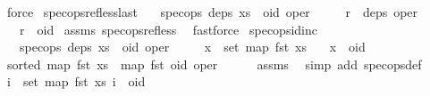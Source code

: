 \begin{isabellebody}
\ force%
\endisatagproof
{\isafoldproof}%
%
\isadelimproof
\isanewline
%
\endisadelimproof
\isanewline
{}\isamarkupfalse%
\ spec{\isacharunderscore}ops{\isacharunderscore}ref{\isacharunderscore}less{\isacharunderscore}last{\isacharcolon}\isanewline
\ \ \ {\isachardoublequoteopen}spec{\isacharunderscore}ops\ deps\ {\isacharparenleft}xs\ {\isacharat}\ {\isacharbrackleft}{\isacharparenleft}oid{\isacharcomma}\ oper{\isacharparenright}{\isacharbrackright}{\isacharparenright}{\isachardoublequoteclose}\isanewline
\ \ \ \ \ {\isachardoublequoteopen}r\ {\isasymin}\ deps\ oper{\isachardoublequoteclose}\isanewline
\ \ \ {\isachardoublequoteopen}r\ {\isacharless}\ oid{\isachardoublequoteclose}\isanewline
%
\isadelimproof
%
\endisadelimproof
%
\isatagproof
{}\isamarkupfalse%
\ assms\ spec{\isacharunderscore}ops{\isacharunderscore}ref{\isacharunderscore}less\ \isamarkupfalse%
\ fastforce%
\endisatagproof
{\isafoldproof}%
%
\isadelimproof
\isanewline
%
\endisadelimproof
\isanewline
{}\isamarkupfalse%
\ spec{\isacharunderscore}ops{\isacharunderscore}id{\isacharunderscore}inc{\isacharcolon}\isanewline
\ \ \ {\isachardoublequoteopen}spec{\isacharunderscore}ops\ deps\ {\isacharparenleft}xs\ {\isacharat}\ {\isacharbrackleft}{\isacharparenleft}oid{\isacharcomma}\ oper{\isacharparenright}{\isacharbrackright}{\isacharparenright}{\isachardoublequoteclose}\isanewline
\ \ \ \ \ {\isachardoublequoteopen}x\ {\isasymin}\ set\ {\isacharparenleft}map\ fst\ xs{\isacharparenright}{\isachardoublequoteclose}\isanewline
\ \ \ {\isachardoublequoteopen}x\ {\isacharless}\ oid{\isachardoublequoteclose}\isanewline
%
\isadelimproof
%
\endisadelimproof
%
\isatagproof
{}\isamarkupfalse%
\ {\isacharminus}\isanewline
\ \ \isamarkupfalse%
\ {\isachardoublequoteopen}sorted\ {\isacharparenleft}{\isacharparenleft}map\ fst\ xs{\isacharparenright}\ {\isacharat}\ {\isacharparenleft}map\ fst\ {\isacharbrackleft}{\isacharparenleft}oid{\isacharcomma}\ oper{\isacharparenright}{\isacharbrackright}{\isacharparenright}{\isacharparenright}{\isachardoublequoteclose}\isanewline
\ \ \ \ \isamarkupfalse%
\ assms{\isacharparenleft}{}{\isacharparenright}\ \isamarkupfalse%
\ {\isacharparenleft}simp\ add{\isacharcolon}\ spec{\isacharunderscore}ops{\isacharunderscore}def{\isacharparenright}\isanewline
\ \ \isamarkupfalse%
\ {\isachardoublequoteopen}{\isasymforall}i\ {\isasymin}\ set\ {\isacharparenleft}map\ fst\ xs{\isacharparenright}{\isachardot}\ i\ {\isasymle}\ oid{\isachardoublequoteclose}\isanewline

\end{isabellebody}
